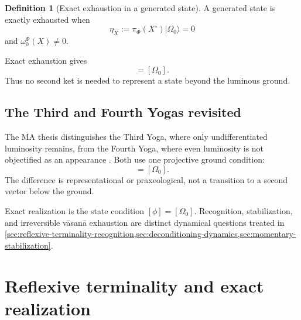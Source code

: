 \documentclass[11pt,reqno]{scrartcl}
\newcommand{\piF}{\pi_{\Phi}}
\newcommand{\omegaF}{\omega_{0}^{\Phi}}
\newcommand{\ket}[1]{\lvert #1\rangle}
\theoremstyle{plain}
\theoremstyle{definition}
\newtheorem{definition}[definition]{Definition}
\theoremstyle{remark}
\begin{document}
\begin{definition}[Exact exhaustion in a generated state]
\label{def:exact-exhaustion-generated-state}
A generated state is exactly exhausted when
\begin{equation}
  \eta_X
  :=\piF(X^{\circ})\ket{\Omega_0}=0
  \label{eq:exact-exhaustion-centered-zero}
\end{equation}
and $\omegaF(X)\neq0$.
\end{definition}

Exact exhaustion gives
\begin{equation}
  [\phi_X]=[\Omega_0].
  \label{eq:exact-exhaustion-ground-ray}
\end{equation}
Thus no second ket is needed to represent a state beyond the luminous ground.

\subsection{The Third and Fourth Yogas revisited}

The MA thesis distinguishes the Third Yoga, where only undifferentiated
luminosity remains, from the Fourth Yoga, where even luminosity is not
objectified as an appearance \cite[pp.~182--185]{Yiannopoulos2012}.  Both use
one projective ground condition:
\begin{equation}
  [\phi]=[\Omega_0].
  \label{eq:third-fourth-same-ground-ray}
\end{equation}
The difference is representational or praxeological, not a transition to a
second vector below the ground.

Exact realization is the state condition $[\phi]=[\Omega_0]$.  Recognition,
stabilization, and irreversible v\=asan\=a exhaustion are distinct dynamical
questions treated in
\cref{sec:reflexive-terminality-recognition,sec:deconditioning-dynamics,sec:momentary-stabilization}.
\section{Reflexive terminality and exact realization}
\label{sec:reflexive-terminality-recognition}
\end{document}
